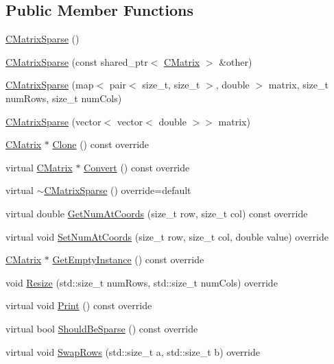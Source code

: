 \subsection*{Public Member Functions}
\begin{DoxyCompactItemize}
\item 
\hyperlink{classCMatrixSparse_a8b07f6b861304fccebc6229968a0baa0}{C\+Matrix\+Sparse} ()
\item 
\hyperlink{classCMatrixSparse_ab2dc89566f3cdcb626a04fb4c89db926}{C\+Matrix\+Sparse} (const shared\+\_\+ptr$<$ \hyperlink{classCMatrix}{C\+Matrix} $>$ \&other)
\item 
\hyperlink{classCMatrixSparse_a154a1f5510bcedba74fec1eeb6ab4af6}{C\+Matrix\+Sparse} (map$<$ pair$<$ size\+\_\+t, size\+\_\+t $>$, double $>$ matrix, size\+\_\+t num\+Rows, size\+\_\+t num\+Cols)
\item 
\hyperlink{classCMatrixSparse_a2477eb8b3d46d83f067fe3c6fcb37772}{C\+Matrix\+Sparse} (vector$<$ vector$<$ double $>$$>$ matrix)
\item 
\hyperlink{classCMatrix}{C\+Matrix} $\ast$ \hyperlink{classCMatrixSparse_a8074d01357ce15ce0392a95d17fed7ef}{Clone} () const override
\item 
virtual \hyperlink{classCMatrix}{C\+Matrix} $\ast$ \hyperlink{classCMatrixSparse_a1519d4cdef830a6df4d0ec900b4413c7}{Convert} () const override
\item 
virtual \hyperlink{classCMatrixSparse_a40f32c0d13b58937ecbb279b670e9ebc}{$\sim$\+C\+Matrix\+Sparse} () override=default
\item 
virtual double \hyperlink{classCMatrixSparse_a1f071b5ed04bb2fb015f97ce7074702d}{Get\+Num\+At\+Coords} (size\+\_\+t row, size\+\_\+t col) const override
\item 
virtual void \hyperlink{classCMatrixSparse_a679c5dd5db307e5c392a424d06b20465}{Set\+Num\+At\+Coords} (size\+\_\+t row, size\+\_\+t col, double value) override
\item 
\hyperlink{classCMatrix}{C\+Matrix} $\ast$ \hyperlink{classCMatrixSparse_a2f545baf72ad2974e1450f8653f9bd06}{Get\+Empty\+Instance} () const override
\item 
void \hyperlink{classCMatrixSparse_a83cd4fce61394f6c2b290bf06d0efd0a}{Resize} (std\+::size\+\_\+t num\+Rows, std\+::size\+\_\+t num\+Cols) override
\item 
virtual void \hyperlink{classCMatrixSparse_acf4a7e41666e6fb29e629c3a62a7fd8f}{Print} () const override
\item 
virtual bool \hyperlink{classCMatrixSparse_ac93b335e198a0dfbb32de9b54c5b77b8}{Should\+Be\+Sparse} () const override
\item 
virtual void \hyperlink{classCMatrixSparse_a0071cd61958d00c313dc524099f1ac4d}{Swap\+Rows} (std\+::size\+\_\+t a, std\+::size\+\_\+t b) override
\end{DoxyCompactItemize}
